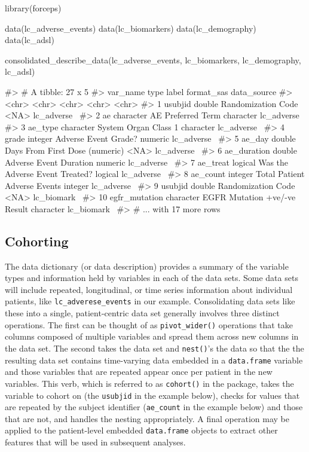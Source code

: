 \begin{Schunk}
\begin{Sinput}
library(forceps)

data(lc_adverse_events)
data(lc_biomarkers)
data(lc_demography)
data(lc_adsl)

consolidated_describe_data(lc_adverse_events,
                           lc_biomarkers,
                           lc_demography,
                           lc_adsl)
\end{Sinput}
\begin{Soutput}
#> # A tibble: 27 x 5
#>    var_name      type      label                          format_sas data_source
#>    <chr>         <chr>     <chr>                          <chr>      <chr>      
#>  1 usubjid       double    Randomization Code             <NA>       lc_adverse~
#>  2 ae            character AE Preferred Term              character  lc_adverse~
#>  3 ae_type       character System Organ Class 1           character  lc_adverse~
#>  4 grade         integer   Adverse Event Grade?           numeric    lc_adverse~
#>  5 ae_day        double    Days From First Dose (numeric) <NA>       lc_adverse~
#>  6 ae_duration   double    Adverse Event Duration         numeric    lc_adverse~
#>  7 ae_treat      logical   Was the Adverse Event Treated? logical    lc_adverse~
#>  8 ae_count      integer   Total Patient Adverse Events   integer    lc_adverse~
#>  9 usubjid       double    Randomization Code             <NA>       lc_biomark~
#> 10 egfr_mutation character EGFR Mutation +ve/-ve Result   character  lc_biomark~
#> # ... with 17 more rows
\end{Soutput}
\end{Schunk}

\hypertarget{cohorting}{%
\subsection{Cohorting}\label{cohorting}}

The data dictionary (or data description) provides a summary of the
variable types and information held by variables in each of the data
sets. Some data sets will include repeated, longitudinal, or time series
information about individual patients, like
\texttt{lc\_adverese\_events} in our example. Consolidating data sets
like these into a single, patient-centric data set generally involves
three distinct operations. The first can be thought of as
\texttt{pivot\_wider()} operations that take columns composed of
multiple variables and spread them across new columns in the data set.
The second takes the data set and \texttt{nest()}'s the data so that the
the resulting data set contains time-varying data embedded in a
\texttt{data.frame} variable and those variables that are repeated
appear once per patient in the new variables. This verb, which is
referred to as \texttt{cohort()} in the package, takes the variable to
cohort on (the \texttt{usubjid} in the example below), checks for values
that are repeated by the subject identifier (\texttt{ae\_count} in the
example below) and those that are not, and handles the nesting
appropriately. A final operation may be applied to the patient-level
embedded \texttt{data.frame} objects to extract other features that will
be used in subsequent analyses.

